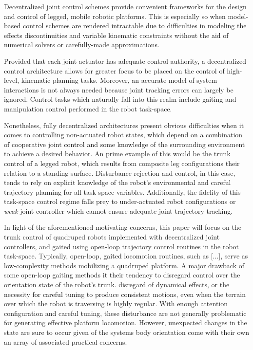 
Decentralized joint control schemes provide convenient frameworks for the design and control 
of legged, mobile robotic platforms. This is especially so when model-based control schemes are rendered
intractable due to difficulties in modeling the effects discontinuities and variable kinematic constraints
without the aid of numerical solvers or carefully-made approximations.

Provided that each joint actuator has adequate control authority, a decentralized control 
architecture allows for greater focus to be placed on the control of high-level, kinematic planning tasks. 
Moreover, an accurate model of system interactions is not always needed because joint tracking errors 
can largely be ignored. 
Control tasks which naturally fall into this realm include gaiting and manipulation control performed in 
the robot task-space.

Nonetheless, fully decentralized architectures present obvious difficulties when it comes to controlling
non-actuated robot states, which depend on a combination of cooperative joint control and some knowledge 
of the surrounding environment to achieve a desired behavior. An prime example of this would be the trunk 
control of a legged robot, which results from composite leg configurations their relation to a standing surface.
Disturbance rejection and control, in this case, tends to rely on explicit knowledge of the robot's environmental 
and careful trajectory planning for all task-space variables. Additionally, the fidelity  of this task-space control
regime falls prey to under-actuated robot configurations or \emph{weak} joint controller which cannot ensure
adequate joint trajectory tracking.

In light of the aforementioned motivating concerns, this paper will focus on the trunk control of quadruped robots 
implemented with decentralized joint controllers, and gaited using open-loop trajectory control routines in the robot
task-space. Typically, open-loop, gaited locomotion routines, such as [...], serve as low-complexity 
methods mobilizing a quadruped platform. A major drawback of some open-loop gaiting methods it their tendency to disregard
control over the orientation state of the robot's trunk. disregard of dynamical effects, or the necessity for careful tuning to produce
consistent motions, even when the terrain over which the robot is traversing is highly regular. With enough attention 
configuration and careful tuning, these disturbance are not generally problematic for generating effective platform locomotion. 
However, unexpected changes in the state are sure to occur given of the systems body orientation come with their own an array 
of associated practical concerns.

